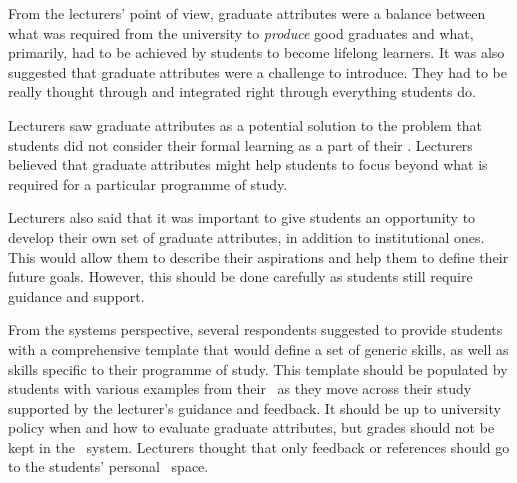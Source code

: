 From the lecturers' point of view, graduate attributes were a balance between
what was required from the university to \textit{produce} good graduates and
what, primarily, had to be achieved by students to become lifelong learners. It
was also suggested that graduate attributes were a challenge to introduce. They
had to be really thought through and integrated right through everything
students do.


Lecturers saw graduate attributes as a potential solution to the problem that
students did not consider their formal learning as a part of their \LLLsn.
Lecturers believed that graduate attributes might help students to focus beyond
what is required for a particular programme of study.

Lecturers also said that it was important to give students an opportunity to
develop their own set of graduate attributes, in addition to institutional ones.
This would allow them to describe their aspirations and help them to define
their future goals. However, this should be done carefully as students still
require guidance and support.


From the systems perspective, several respondents suggested to provide students
with a comprehensive template that would define a set of generic \LLLs skills,
as well as skills specific to their programme of study. This template should be
populated by students with various examples from their \ep~as they move across
their study supported by the lecturer's guidance and feedback. It should be up
to university policy when and how to evaluate graduate attributes, but grades
should not be kept in the \ep~system. Lecturers thought that only feedback or
references should go to the students' personal \ep~space.

